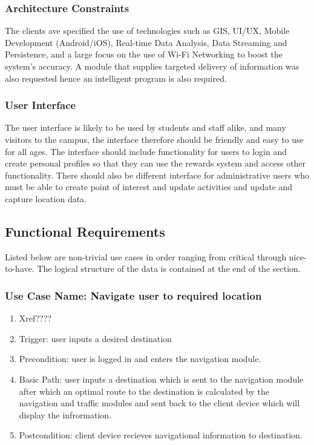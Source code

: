 \documentclass[11pt,a4paper]{article}
\begin{document}
			\subsubsection{Architecture Constraints}
				The clients ave specified the use of technologies such as GIS, UI/UX, Mobile Development (Android/iOS),  Real-time Data Analysis, Data Streaming and
				Persistence, and a large focus on the use of Wi-Fi Networking to boost the system's accuracy. A module that supplies targeted delivery of information was also requested hence an intelligent program is also required.
				
			\subsubsection{User Interface}
				The user interface is likely to be used by students and staff alike, and many visitors to the campus, the interface therefore should be friendly and easy to use for all ages. The interface should include functionality for users to login and create personal profiles
				so that they can use the rewards system and access other functionality. There should also be different interface for administrative users who must be able to create point of interest and update activities and update and capture location data.
	\newpage	
	\subsection{Functional Requirements}
		Listed below are non-trivial use cases in order ranging from critical through nice-to-have. The logical structure of the data is contained at the end of the section.
		
			\subsubsection{Use Case Name: Navigate user to required location}
				\begin{enumerate}
				\renewcommand{\labelenumi}{{\textbf{\arabic{enumi}.}}}
				\item Xref????  %
				\item Trigger: user inputs a desired destination
				\item Precondition: user is logged in and enters the navigation module.
				\item Basic Path: user inputs a destination which is sent to the navigation module after which an optimal route to the destination is calculated by the navigation and traffic modules and sent back to the client device which will display the infrormation.
				\item Postcondition: client device recieves navigational information to destination.
				\end{enumerate}
				
\end{document}
